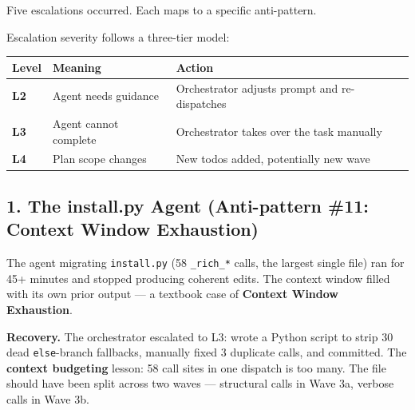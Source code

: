 \documentclass[
  a4paper,
  DIV=11,
  numbers=noendperiod]{scrreprt}
\newcounter{none} %
\begin{document}
Five escalations occurred. Each maps to a specific anti-pattern.

Escalation severity follows a three-tier model:

{\def\LTcaptype{none} %
\begin{longtable}[]{@{}
  >{\raggedright\arraybackslash}p{}
  >{\raggedright\arraybackslash}p{}
  >{\raggedright\arraybackslash}p{}@{}}
\toprule\noalign{}
\begin{minipage}[b]{\linewidth}\raggedright
Level
\end{minipage} & \begin{minipage}[b]{\linewidth}\raggedright
Meaning
\end{minipage} & \begin{minipage}[b]{\linewidth}\raggedright
Action
\end{minipage} \\
\midrule\noalign{}
\endhead
\bottomrule\noalign{}
\endlastfoot
\textbf{L2} & Agent needs guidance & Orchestrator adjusts prompt and
re-dispatches \\
\textbf{L3} & Agent cannot complete & Orchestrator takes over the task
manually \\
\textbf{L4} & Plan scope changes & New todos added, potentially new
wave \\
\end{longtable}
}

\subsection{1. The install.py Agent (Anti-pattern \#11: Context Window
Exhaustion)}\label{the-install.py-agent-anti-pattern-11-context-window-exhaustion}

The agent migrating \texttt{install.py} (58 \texttt{\_rich\_*} calls,
the largest single file) ran for 45+ minutes and stopped producing
coherent edits. The context window filled with its own prior output ---
a textbook case of \textbf{Context Window Exhaustion}.

\textbf{Recovery.} The orchestrator escalated to L3: wrote a Python
script to strip 30 dead \texttt{else}-branch fallbacks, manually fixed 3
duplicate calls, and committed. The \textbf{context budgeting} lesson:
58 call sites in one dispatch is too many. The file should have been
split across two waves --- structural calls in Wave 3a, verbose calls in
Wave 3b.
\end{document}
